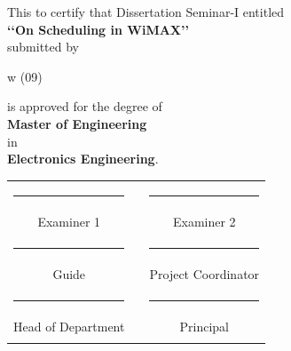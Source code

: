 \begin{center}
\large This to certify that Dissertation Seminar-I entitled\\
\textbf{\lq\lq On Scheduling in WiMAX\rq\rq} \\submitted by
\begin{center}
 w (09)\\
\end{center}
is approved for the degree of \\ \textbf {Master of Engineering}\\ in\\ \textbf {Electronics Engineering}.\\

\vspace{1in}
\begin{tabular}{ccc}
      \rule{5cm}{1sp}                &\rule{10mm}{0pt}& \rule{5cm}{1sp}
      \\\vspace{0.5in}
      Examiner 1                 && Examiner 2 \\
      \rule{5cm}{1sp}                && \rule{5cm}{1sp} \\ \vspace{0.5in}
       Guide             && Project Coordinator \\
      \rule{5cm}{1sp}                && \rule{5cm}{1sp} \\
      Head of Department                && Principal \\\\
    \end{tabular}
\end{center}
\cleardoublepage


